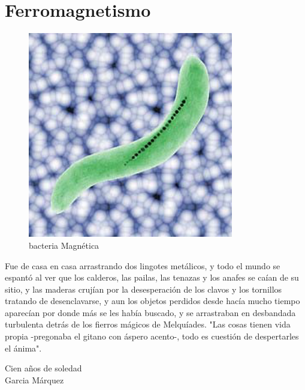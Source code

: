 
\chapter{Ferromagnetismo} %

\begin{figure}[H]
    \centering
    \includegraphics[width=0.8\textwidth]{./Figures/bacteriaMagnetica}
	\caption{bacteria Magnética}
	\label{fig:bacteriaMagnetica}
\end{figure}

\begin{center}

Fue de casa en casa arrastrando dos lingotes metálicos, y todo el mundo se
espantó al ver que los calderos, las pailas, las tenazas y los anafes se caían de su sitio, y las maderas crujían por la desesperación de los clavos y los tornillos tratando de desenclavarse, y aun los objetos perdidos desde hacía mucho tiempo aparecían por donde más se les había buscado, y se arrastraban en desbandada turbulenta detrás de los fierros mágicos de Melquíades. "Las cosas tienen vida propia -pregonaba el gitano con áspero acento-, todo es cuestión de despertarles el ánima".

\hspace{6.6cm} Cien años de soledad\\
\hspace{7.6cm} Garcia Márquez

\end{center}


